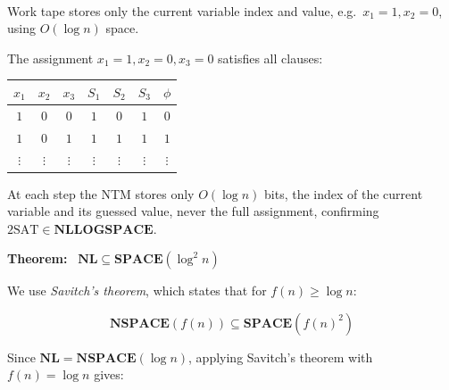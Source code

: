 \documentclass[12pt,a4paper,openany]{article}
\begin{document}
\begin{center}
\\[0.5em]
{\small Work tape stores only the current variable index and value, e.g.\ $x_1=1, x_2=0$, using $O(\log n)$ space.}
\end{center}

The assignment $x_1=1, x_2=0, x_3=0$ satisfies all clauses:
\begin{center}
\begin{tabular}{ccc|ccc|c}
$x_1$ & $x_2$ & $x_3$ & $S_1$ & $S_2$ & $S_3$ & $\phi$ \\ \hline
$1$ & $0$ & $0$ & $1$ & $0$ & $1$ & $0$ \\
$1$ & $0$ & $1$ & $1$ & $1$ & $1$ & $1$ \\
$\vdots$ & $\vdots$ & $\vdots$ & $\vdots$ & $\vdots$ & $\vdots$ & $\vdots$ \\
\end{tabular}
\end{center}

At each step the NTM stores only $O(\log n)$ bits, the index of the current variable
and its guessed value, never the full assignment, confirming $\mathrm{2SAT} \in \mathbf{NLLOGSPACE}$.

\bigskip
\textbf{Theorem:} \ $\mathbf{NL} \subseteq \mathbf{SPACE}(\log^2 n)$

We use \emph{Savitch's theorem}, which states that for $f(n) \geq \log n$:

\[
\mathbf{NSPACE}(f(n)) \subseteq \mathbf{SPACE}(f(n)^2)
\]

Since $\mathbf{NL} = \mathbf{NSPACE}(\log n)$, applying Savitch's theorem with $f(n) = \log n$ gives:
\end{document}
